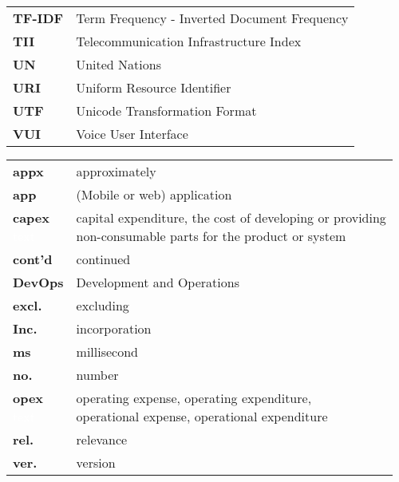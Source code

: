 \begin{flushleft}
\begin{tabular}{ll}
\textbf{TF-IDF}	&	Term Frequency - Inverted Document Frequency\\
\textbf{TII}	&	Telecommunication Infrastructure Index\\

\textbf{UN}		&	United Nations\\
\textbf{URI}		&	Uniform Resource Identifier\\
\textbf{UTF} & Unicode Transformation Format\\

\textbf{VUI}	&	Voice User Interface\\




\end{tabular}
\end{flushleft}


\begin{flushleft}
	\begin{tabular}{ll}
		
\textbf{appx}	&	approximately\\
\textbf{app}	&	(Mobile or web) application\\
\shortstack[l]{\textbf{capex} \\ \textcolor{white}{text}}	&	\shortstack[l]{capital expenditure, the cost of developing or providing \\ non-consumable parts for the product or system}\\
\textbf{cont'd}	&	continued\\
\textbf{DevOps}	&	Development and Operations\\
\textbf{excl.}	& 	excluding\\

\textbf{Inc.}	&	incorporation\\

\textbf{ms}	& 	millisecond\\

\textbf{no.}	& 	number\\

\shortstack[l]{\textbf{opex} \\ \textcolor{white}{text}}	& 	\shortstack[l]{operating expense, operating expenditure,\\ operational expense, operational expenditure} \\
\textbf{rel.}	&	relevance\\
\textbf{ver.}	& 	version \\
\end{tabular}
\end{flushleft}


